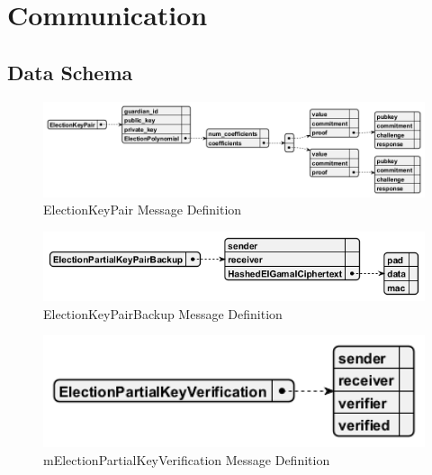 \section{Communication}

\subsection{Data Schema}

\begin{figure}
    \centering
    \includegraphics[width=1\textwidth]{abbildungen/Diagramme/mElectionKeyPair.png}
    \caption{ElectionKeyPair Message Definition}
    \label{Fig:keypair}
\end{figure}

\begin{figure}
    \centering
    \includegraphics[width=1\textwidth]{abbildungen/Diagramme/mElectionPartialKeyPairBackup.png}
    \caption{ElectionKeyPairBackup Message Definition}
    \label{Fig:backup}
\end{figure}

\begin{figure}
    \centering
    \includegraphics[width=1\textwidth]{abbildungen/Diagramme/mElectionPartialKeyVerification.png}
    \caption{mElectionPartialKeyVerification Message Definition}
    \label{Fig:verification}
\end{figure}


